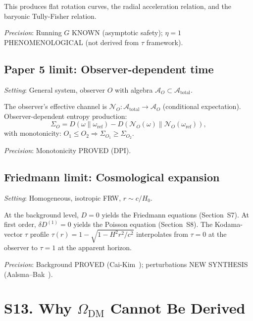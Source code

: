 \documentclass[aps,prd,preprint,superscriptaddress,longbibliography]{revtex4-2}
\newcommand{\chan}{\mathcal{N}}
\newcommand{\KL}{D}
\newcommand{\tauasym}{\tau}
\begin{document}
This produces flat rotation curves, the radial acceleration
relation, and the baryonic Tully-Fisher relation.

\emph{Precision}: Running $G$ KNOWN (asymptotic safety);
$\eta=1$ PHENOMENOLOGICAL (not derived from $\tauasym$ framework).

\subsection{Paper 5 limit: Observer-dependent time}

\emph{Setting}: General system, observer $O$ with algebra
$\mathcal{A}_O\subset\mathcal{A}_{\mathrm{total}}$.

The observer's effective channel is
$\chan_O:\mathcal{A}_{\mathrm{total}}\to\mathcal{A}_O$ (conditional
expectation).  Observer-dependent entropy production:
\begin{equation}
\Sigma_O = \KL(\omega\|\omega_{\mathrm{ref}})
- \KL(\chan_O(\omega)\|\chan_O(\omega_{\mathrm{ref}})),
\end{equation}
with monotonicity: $O_1\le O_2\Rightarrow\Sigma_{O_1}\ge\Sigma_{O_2}$.

\emph{Precision}: Monotonicity PROVED (DPI).

\subsection{Friedmann limit: Cosmological expansion}

\emph{Setting}: Homogeneous, isotropic FRW, $r\sim c/H_0$.

At the background level, $\KL = 0$ yields the Friedmann equations
(Section~S7).  At first order, $\delta\KL^{(1)}=0$ yields the
Poisson equation (Section~S8).  The Kodama-vector $\tauasym$ profile
$\tauasym(r) = 1 - \sqrt{1-H^2r^2/c^2}$ interpolates from $\tauasym=0$
at the observer to $\tauasym=1$ at the apparent horizon.

\emph{Precision}: Background PROVED (Cai-Kim~\cite{CaiKim2005});
perturbations NEW SYNTHESIS (Aalsma--Bak~\cite{AalsmaBak2025}).

\section{S13. Why $\Omega_{\mathrm{DM}}$ Cannot Be Derived}
\label{sec:Omega_DM}
\end{document}
